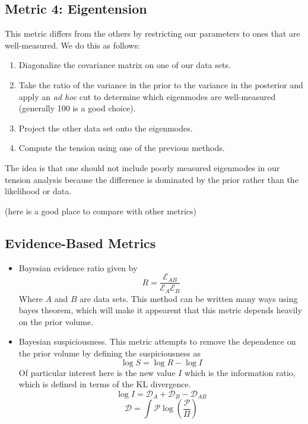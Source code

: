 \subsection{Metric 4: Eigentension}
This metric differs from the others by restricting our parameters to ones that are well-measured. We do this as follows:
\begin{enumerate}
	\item Diagonalize the covariance matrix on one of our data sets.
	\item Take the ratio of the variance in the prior to the variance in the posterior and apply an \textit{ad hoc} cut to determine which eigenmodes are well-measured (generally 100 is a good choice).
	\item Project the other data set onto the eigenmodes.
	\item Compute the tension using one of the previous methods.
\end{enumerate}
The idea is that one should not include poorly measured eigenmodes in our tension analysis because the difference is dominated by the prior rather than the likelihood or data.

(here is a good place to compare with other metrics)

\subsection{Evidence-Based Metrics}
\begin{itemize}
	\item Bayesian evidence ratio given by
	\begin{equation}
		R = \frac{\mathcal{E}_{AB}}{\mathcal{E}_A\mathcal{E}_B}
	\end{equation}
	Where $A$ and $B$ are data sets. This method can be written many ways using bayes theorem, which will make it appearent that this metric depends heavily on the prior volume.
    \item Bayesian suspiciousness. This metric attempts to remove the dependence on the prior volume by defining the suspiciousness as 
	\begin{equation}
		\log S = \log R - \log I
	\end{equation}
	Of particular interest here is the new value $I$ which is the information ratio, which is defined in terms of the KL divergence.
	\begin{equation}
		\log I = \mathcal{D}_A + \mathcal{D}_B - \mathcal{D}_{AB}
	\end{equation}
	\begin{equation}
		\mathcal{D} = \int \mathcal{P} \log(\frac{\mathcal{P}}{\Pi})
	\end{equation}
\end{itemize}

